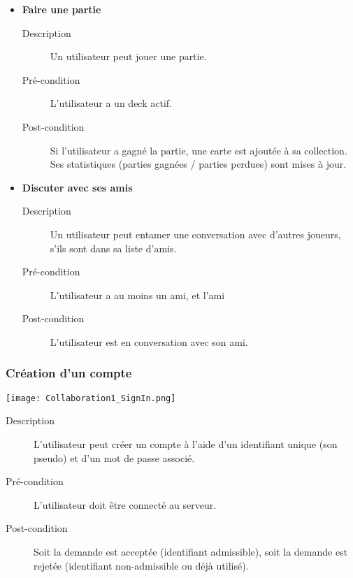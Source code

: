 \documentclass{article}
\begin{document}
\begin{itemize}
				\item \textbf{Faire une partie}
				\begin{description}
					\item[Description] Un utilisateur peut jouer une partie.
					\item[Pré-condition] L'utilisateur a un deck actif.
					\item[Post-condition] Si l'utilisateur a gagné la partie, une carte est ajoutée à sa collection.
					Ses statistiques (parties gagnées / parties perdues) sont mises à jour.\\
				\end{description}

				\item \textbf{Discuter avec ses amis}
				\begin{description}
					\item[Description] Un utilisateur peut entamer une conversation avec d'autres joueurs, s'ils sont dans sa liste d'amis.
					\item[Pré-condition] L'utilisateur a au moins un ami, et l'ami
					\item[Post-condition] L'utilisateur est en conversation avec son ami.
				\end{description}
			\end{itemize}

		\subsubsection{Création d'un compte}
			\begin{center}\texttt{[image: Collaboration1\_SignIn.png]}\end{center}

			\begin{description}
				\item[Description] L'utilisateur peut créer un compte à l'aide d'un identifiant unique (son pseudo) et d'un mot de passe associé.
				\item[Pré-condition] L'utilisateur doit être connecté au serveur.
				\item[Post-condition] Soit la demande est acceptée (identifiant admissible), soit la demande est rejetée (identifiant non-admissible ou déjà utilisé).
			\end{description}
\end{document}
